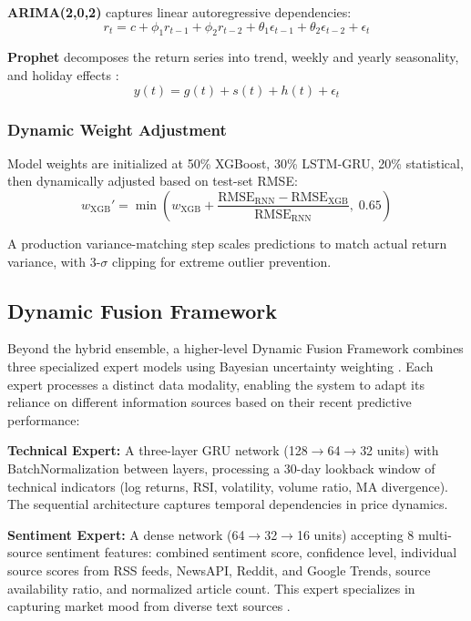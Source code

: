 \documentclass[12pt,a4paper]{article}
\begin{document}
\textbf{ARIMA(2,0,2)} captures linear autoregressive dependencies:
\begin{equation}
r_t = c + \phi_1 r_{t-1} + \phi_2 r_{t-2} + \theta_1 \epsilon_{t-1} + \theta_2 \epsilon_{t-2} + \epsilon_t
\end{equation}

\textbf{Prophet} decomposes the return series into trend, weekly and yearly seasonality, and holiday effects \cite{taylor2018forecasting}:
\begin{equation}
y(t) = g(t) + s(t) + h(t) + \epsilon_t
\end{equation}

\subsubsection{Dynamic Weight Adjustment}

Model weights are initialized at 50\% XGBoost, 30\% LSTM-GRU, 20\% statistical, then dynamically adjusted based on test-set RMSE:
\begin{equation}
w_{\text{XGB}}' = \min\left(w_{\text{XGB}} + \frac{\text{RMSE}_{\text{RNN}} - \text{RMSE}_{\text{XGB}}}{\text{RMSE}_{\text{RNN}}}, \; 0.65\right)
\end{equation}

A production variance-matching step scales predictions to match actual return variance, with 3-$\sigma$ clipping for extreme outlier prevention.

\subsection{Dynamic Fusion Framework}

Beyond the hybrid ensemble, a higher-level Dynamic Fusion Framework combines three specialized expert models using Bayesian uncertainty weighting \cite{gal2016uncertainty}. Each expert processes a distinct data modality, enabling the system to adapt its reliance on different information sources based on their recent predictive performance:

\textbf{Technical Expert:} A three-layer GRU network (128$\rightarrow$64$\rightarrow$32 units) with BatchNormalization between layers, processing a 30-day lookback window of technical indicators (log returns, RSI, volatility, volume ratio, MA divergence). The sequential architecture captures temporal dependencies in price dynamics.

\textbf{Sentiment Expert:} A dense network (64$\rightarrow$32$\rightarrow$16 units) accepting 8 multi-source sentiment features: combined sentiment score, confidence level, individual source scores from RSS feeds, NewsAPI, Reddit, and Google Trends, source availability ratio, and normalized article count. This expert specializes in capturing market mood from diverse text sources \cite{bollen2011twitter, loughran2011liability}.
\end{document}
